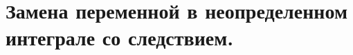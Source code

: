 \documentclass[../main.tex]{subfiles}
\begin{document}
\newpage
\section{Замена переменной в неопределенном интеграле со следствием.}
\end{document}
